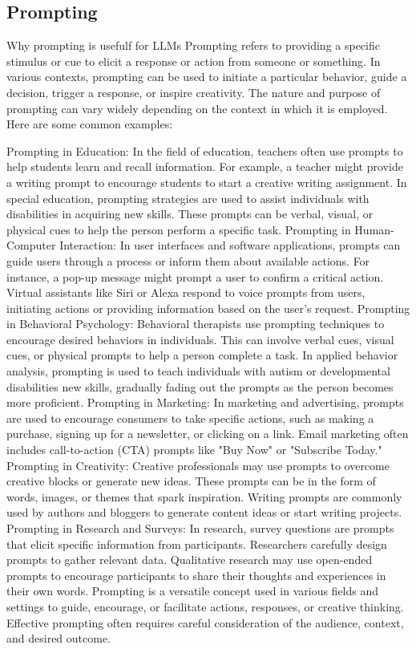 \subsection{Prompting}
Why prompting is usefulf for LLMs
Prompting refers to providing a specific stimulus or cue to elicit a response or action from someone or something. In various contexts, prompting can be used to initiate a particular behavior, guide a decision, trigger a response, or inspire creativity. The nature and purpose of prompting can vary widely depending on the context in which it is employed. Here are some common examples:

Prompting in Education:
In the field of education, teachers often use prompts to help students learn and recall information. For example, a teacher might provide a writing prompt to encourage students to start a creative writing assignment.
In special education, prompting strategies are used to assist individuals with disabilities in acquiring new skills. These prompts can be verbal, visual, or physical cues to help the person perform a specific task.
Prompting in Human-Computer Interaction:
In user interfaces and software applications, prompts can guide users through a process or inform them about available actions. For instance, a pop-up message might prompt a user to confirm a critical action.
Virtual assistants like Siri or Alexa respond to voice prompts from users, initiating actions or providing information based on the user's request.
Prompting in Behavioral Psychology:
Behavioral therapists use prompting techniques to encourage desired behaviors in individuals. This can involve verbal cues, visual cues, or physical prompts to help a person complete a task.
In applied behavior analysis, prompting is used to teach individuals with autism or developmental disabilities new skills, gradually fading out the prompts as the person becomes more proficient.
Prompting in Marketing:
In marketing and advertising, prompts are used to encourage consumers to take specific actions, such as making a purchase, signing up for a newsletter, or clicking on a link.
Email marketing often includes call-to-action (CTA) prompts like "Buy Now" or "Subscribe Today."
Prompting in Creativity:
Creative professionals may use prompts to overcome creative blocks or generate new ideas. These prompts can be in the form of words, images, or themes that spark inspiration.
Writing prompts are commonly used by authors and bloggers to generate content ideas or start writing projects.
Prompting in Research and Surveys:
In research, survey questions are prompts that elicit specific information from participants. Researchers carefully design prompts to gather relevant data.
Qualitative research may use open-ended prompts to encourage participants to share their thoughts and experiences in their own words.
Prompting is a versatile concept used in various fields and settings to guide, encourage, or facilitate actions, responses, or creative thinking. Effective prompting often requires careful consideration of the audience, context, and desired outcome.
